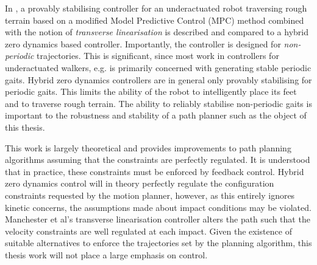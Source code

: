 In \cite{manchester2011stable}, a provably stabilising controller for an underactuated robot traversing rough terrain based on a modified Model Predictive Control (MPC) method combined with the notion of \textit{transverse linearisation} is described and compared to a hybrid zero dynamics based controller. Importantly, the controller is designed for \textit{non-periodic} trajectories. This is significant, since most work in controllers for underactuated walkers, e.g. \cite{martin2014design, sreenath2011compliant, raibert2008bigdog} is primarily concerned with generating stable periodic gaits. Hybrid zero dynamics controllers are in general only provably stabilising for periodic gaits. This limits the ability of the robot to intelligently place its feet and to traverse rough terrain. The ability to reliably stabilise non-periodic gaits is important to the robustness and stability of a path planner such as the object of this thesis. %


This work is largely theoretical and provides improvements to path planning algorithms assuming that the constraints are perfectly regulated. It is understood that in practice, these constraints must be enforced by feedback control. Hybrid zero dynamics control will in theory perfectly regulate the configuration constraints requested by the motion planner, however, as this entirely ignores kinetic concerns, the assumptions made about impact conditions may be violated. Manchester et al's \cite{manchester2011stable} transverse linearisation controller alters the path such that the velocity constraints are well regulated at each impact. Given the existence of suitable alternatives to enforce the trajectories set by the planning algorithm, this thesis work will not place a large emphasis on control.
